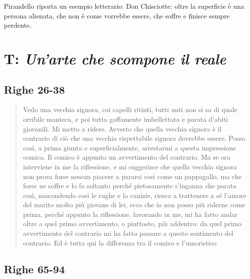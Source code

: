 \documentclass[a4paper, twoside, titlepage]{book}
\newcounter{mar}
\begin{document}
Pirandello riporta un esempio letterario: Don Chisciotte: oltre la superficie è una persona alienata, che non è come vorrebbe essere, che soffre e finisce sempre perdente.

\section{T: \textit{Un'arte che scompone il reale}}

\subsection*{Righe 26-38}

\begin{quotation}
Vedo una vecchia signora, coi capelli ritinti, tutti unti non si sa di quale orribile manteca, e poi tutta goffamente imbellettata e parata d’abiti giovanili. Mi metto a ridere. Avverto che quella vecchia signora è il contrario di ciò che una vecchia rispettabile signora dovrebbe essere. Posso così, a prima giunta e superficialmente, arrestarmi a questa impressione comica. Il comico è appunto un avvertimento del contrario. Ma se ora interviene in me la riflessione, e mi suggerisce che quella vecchia signora non prova forse nessun piacere a pararsi così come un pappagallo, ma che forse ne soffre e lo fa soltanto perché pietosamente s’inganna che parata così, nascondendo così le rughe e la canizie, riesca a trattenere a sé l’amore del marito molto più giovane di lei, ecco che io non posso più riderne come prima, perché appunto la riflessione, lavorando in me, mi ha fatto andar oltre a quel primo avvertimento, o piuttosto, più addentro: da quel primo avvertimento del contrario mi ha fatto passare a questo sentimento del contrario. Ed è tutta qui la differenza tra il comico e l’umoristico
\end{quotation}

\subsection*{Righe 65-94}
\end{document}

